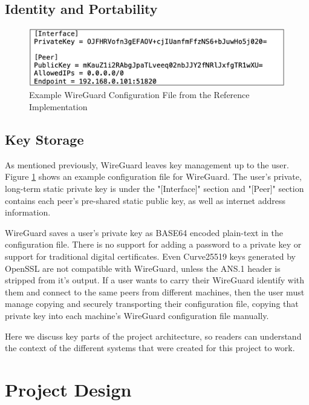 \documentclass [11pt, proquest] {uwthesis}[2020/02/24]
\begin{document}
\subsection {Identity and Portability}
\label{identity}

\begin{figure}[ht]
\includegraphics[width=12cm]{paper/images/wg_conf_std.png}
\caption{Example WireGuard Configuration File from the Reference Implementation}
\label{fig:wg_config}
\end{figure}

\subsection{Key Storage}
As mentioned previously, WireGuard leaves key management up to the user.
Figure \ref{fig:wg_config} shows an example configuration file for WireGuard. The user's private, long-term static private key is under the "[Interface]" section and "[Peer]" section contains each peer's pre-shared static public key, as well as internet address information.

WireGuard saves a user's private key as BASE64 encoded plain-text in the configuration file. There is no support for adding a password to a private key or support for traditional digital certificates. Even Curve25519 keys generated by OpenSSL are not compatible with WireGuard, unless the ANS.1 header is stripped from it's output.
If a user wants to carry their WireGuard identify with them and connect to the same peers from different machines, then the user must manage copying and securely transporting their configuration file, copying that private key into each machine's WireGuard configuration file manually. 


Here we discuss key parts of the project architecture, so readers can understand the context of the different systems that were created for this project to work.
\section{Project Design}
\end{document}

